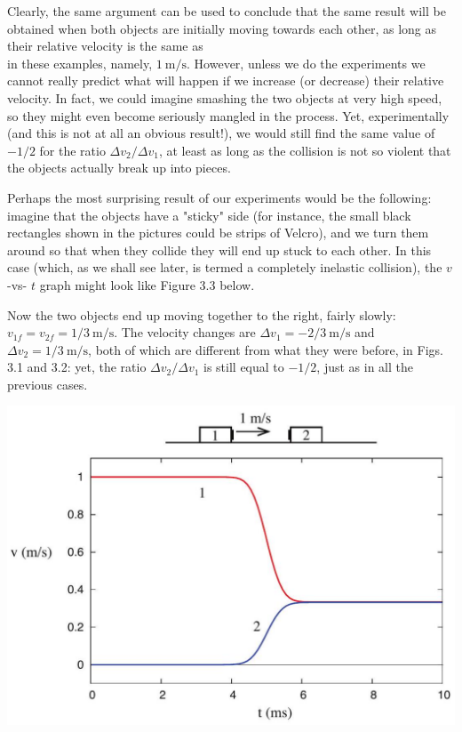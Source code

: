 \documentclass[10pt]{article}
\begin{document}
Clearly, the same argument can be used to conclude that the same result will be obtained when both objects are initially moving towards each other, as long as their relative velocity is the same as\\
in these examples, namely, $1 \mathrm{~m} / \mathrm{s}$. However, unless we do the experiments we cannot really predict what will happen if we increase (or decrease) their relative velocity. In fact, we could imagine smashing the two objects at very high speed, so they might even become seriously mangled in the process. Yet, experimentally (and this is not at all an obvious result!), we would still find the same value of $-1 / 2$ for the ratio $\Delta v_{2} / \Delta v_{1}$, at least as long as the collision is not so violent that the objects actually break up into pieces.

Perhaps the most surprising result of our experiments would be the following: imagine that the objects have a "sticky" side (for instance, the small black rectangles shown in the pictures could be strips of Velcro), and we turn them around so that when they collide they will end up stuck to each other. In this case (which, as we shall see later, is termed a completely inelastic collision), the $v$-vs- $t$ graph might look like Figure 3.3 below.

Now the two objects end up moving together to the right, fairly slowly: $v_{1 f}=v_{2 f}=1 / 3 \mathrm{~m} / \mathrm{s}$. The velocity changes are $\Delta v_{1}=-2 / 3 \mathrm{~m} / \mathrm{s}$ and $\Delta v_{2}=1 / 3 \mathrm{~m} / \mathrm{s}$, both of which are different from what they were before, in Figs. 3.1 and 3.2: yet, the ratio $\Delta v_{2} / \Delta v_{1}$ is still equal to $-1 / 2$, just as in all the previous cases.

\begin{center}
\includegraphics[max width=\textwidth]{2024_09_14_9969b06773f10b6936e8g-072}
\end{center}
\end{document}
